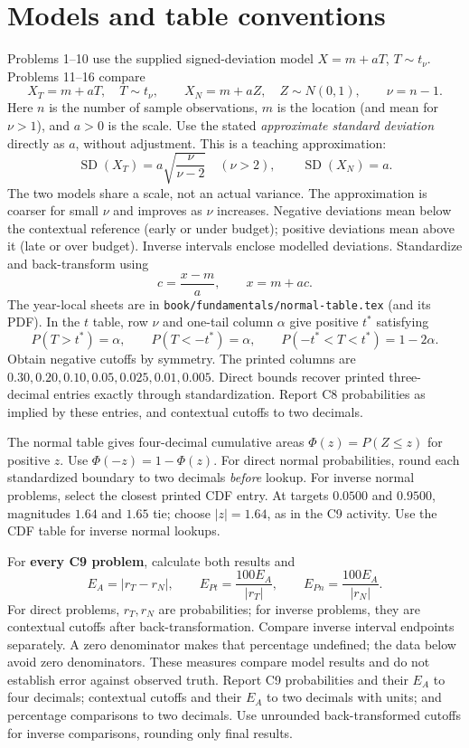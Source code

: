 \section*{Models and table conventions}
Problems 1--10 use the supplied signed-deviation model $X=m+aT$, $T\sim t_\nu$.
Problems 11--16 compare
\[
 X_T=m+aT,\quad T\sim t_\nu,\qquad X_N=m+aZ,\quad Z\sim N(0,1),
 \qquad \boxed{\nu=n-1}.
\]
Here $n$ is the number of sample observations, $m$ is the location (and mean for $\nu>1$), and $a>0$ is the scale.
Use the stated \emph{approximate standard deviation} directly as $a$, without adjustment.
This is a teaching approximation:
\[
 \operatorname{SD}(X_T)=a\sqrt{\frac{\nu}{\nu-2}}\quad(\nu>2),
 \qquad \operatorname{SD}(X_N)=a.
\]
The two models share a scale, not an actual variance. The approximation is coarser for small $\nu$ and improves as $\nu$ increases.
Negative deviations mean below the contextual reference (early or under budget); positive deviations mean above it (late or over budget).
Inverse intervals enclose modelled deviations. Standardize and back-transform using
\[
 \boxed{c=\frac{x-m}{a}},\qquad \boxed{x=m+ac}.
\]
The year-local sheets are in \texttt{book/fundamentals/normal-table.tex} (and its PDF).
In the $t$ table, row $\nu$ and one-tail column $\alpha$ give positive $t^*$ satisfying
\[
 P(T>t^*)=\alpha,\qquad P(T<-t^*)=\alpha,\qquad
 P(-t^*<T<t^*)=1-2\alpha.
\]
Obtain negative cutoffs by symmetry. The printed columns are
$0.30,0.20,0.10,0.05,0.025,0.01,0.005$.
Direct bounds recover printed three-decimal entries exactly through standardization.
Report C8 probabilities as implied by these entries, and contextual cutoffs to two decimals.

The normal table gives four-decimal cumulative areas $\Phi(z)=P(Z\le z)$ for positive $z$.
Use $\Phi(-z)=1-\Phi(z)$. For direct normal probabilities, round each standardized boundary to two decimals \emph{before} lookup.
For inverse normal problems, select the closest printed CDF entry.
At targets $0.0500$ and $0.9500$, magnitudes $1.64$ and $1.65$ tie; choose $|z|=1.64$, as in the C9 activity.
Use the CDF table for inverse normal lookups.

For \textbf{every C9 problem}, calculate both results and
\[
 E_A=|r_T-r_N|,\qquad E_{Pt}=\frac{100E_A}{|r_T|},\qquad
 E_{Pn}=\frac{100E_A}{|r_N|}.
\]
For direct problems, $r_T,r_N$ are probabilities; for inverse problems, they are contextual cutoffs after back-transformation.
Compare inverse interval endpoints separately.
A zero denominator makes that percentage undefined; the data below avoid zero denominators.
These measures compare model results and do not establish error against observed truth.
Report C9 probabilities and their $E_A$ to four decimals; contextual cutoffs and their $E_A$ to two decimals with units; and percentage comparisons to two decimals.
Use unrounded back-transformed cutoffs for inverse comparisons, rounding only final results.


